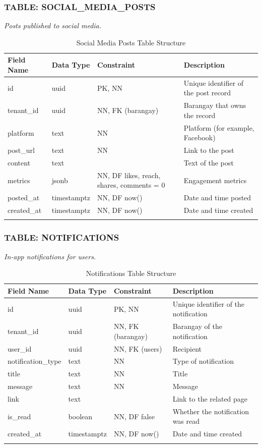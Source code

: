 \subsubsection*{TABLE: SOCIAL\_MEDIA\_POSTS}
\noindent\textit{Posts published to social media.}
\begin{longtable}{|p{3.2cm}|p{2.2cm}|p{3.2cm}|p{5.4cm}|}
\hline
\textbf{Field Name} & \textbf{Data Type} & \textbf{Constraint} & \textbf{Description} \\ \hline
\endhead
\hline \endfoot
\hline \endlastfoot
id & uuid & PK, NN & Unique identifier of the post record \\ \hline
tenant\_id & uuid & NN, FK (barangay) & Barangay that owns the record \\ \hline
platform & text & NN & Platform (for example, Facebook) \\ \hline
post\_url & text & NN & Link to the post \\ \hline
content & text & & Text of the post \\ \hline
metrics & jsonb & NN, DF likes, reach, shares, comments = 0 & Engagement metrics \\ \hline
posted\_at & timestamptz & NN, DF now() & Date and time posted \\ \hline
created\_at & timestamptz & NN, DF now() & Date and time created \\ \hline
\caption{Social Media Posts Table Structure}
\label{tab:social_media_posts}
\end{longtable}
\vspace{3mm}

\subsubsection*{TABLE: NOTIFICATIONS}
\noindent\textit{In-app notifications for users.}
\begin{longtable}{|p{3.2cm}|p{2.2cm}|p{3.2cm}|p{5.4cm}|}
\hline
\textbf{Field Name} & \textbf{Data Type} & \textbf{Constraint} & \textbf{Description} \\ \hline
\endhead
\hline \endfoot
\hline \endlastfoot
id & uuid & PK, NN & Unique identifier of the notification \\ \hline
tenant\_id & uuid & NN, FK (barangay) & Barangay of the notification \\ \hline
user\_id & uuid & NN, FK (users) & Recipient \\ \hline
notification\_type & text & NN & Type of notification \\ \hline
title & text & NN & Title \\ \hline
message & text & NN & Message \\ \hline
link & text & & Link to the related page \\ \hline
is\_read & boolean & NN, DF false & Whether the notification was read \\ \hline
created\_at & timestamptz & NN, DF now() & Date and time created \\ \hline
\caption{Notifications Table Structure}
\label{tab:notifications}
\end{longtable}
\vspace{3mm}


